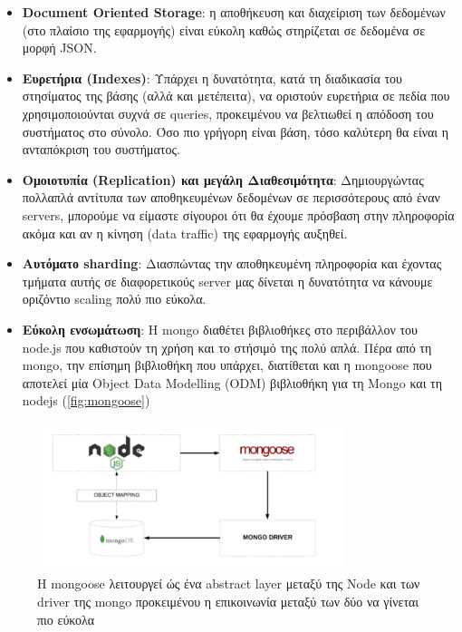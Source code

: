 \begin{itemize}
	\item \textbf{Document Oriented Storage}: η αποθήκευση και διαχείριση των δεδομένων
		(στο πλαίσιο της εφαρμογής) είναι εύκολη καθώς στηρίζεται σε δεδομένα σε μορφή JSON.
	\item \textbf{Ευρετήρια (Indexes)}: Υπάρχει η δυνατότητα, κατά τη διαδικασία του στησίματος της βάσης (αλλά και μετέπειτα),
		να οριστούν ευρετήρια σε πεδία που χρησιμοποιούνται συχνά σε queries, προκειμένου
		να βελτιωθεί η απόδοση του συστήματος στο σύνολο. Όσο πιο γρήγορη είναι βάση, τόσο
		καλύτερη θα είναι η ανταπόκριση του συστήματος. 
	\item \textbf{Ομοιοτυπία (Replication) και μεγάλη Διαθεσιμότητα}: Δημιουργώντας πολλαπλά αντίτυπα των αποθηκευμένων δεδομένων	
		σε περισσότερους από έναν servers, μπορούμε να είμαστε σίγουροι ότι θα έχουμε πρόσβαση στην
		πληροφορία ακόμα και αν η κίνηση (data traffic) της εφαρμογής αυξηθεί.
	\item \textbf{Αυτόματο sharding}: Διασπώντας την αποθηκευμένη πληροφορία και έχοντας τμήματα αυτής σε διαφορετικούς server
		μας δίνεται η δυνατότητα να κάνουμε οριζόντιο scaling πολύ πιο εύκολα. 
	\item \textbf{Εύκολη ενσωμάτωση}: Η mongo διαθέτει βιβλιοθήκες στο περιβάλλον του node.js που καθιστούν
		τη χρήση και το στήσιμό της πολύ απλά. Πέρα από τη mongo, την επίσημη βιβλιοθήκη που υπάρχει,
		διατίθεται και η mongoose που αποτελεί μία Object Data Modelling (ODM) βιβλιοθήκη για τη Mongo και τη nodejs (\autoref{fig:mongoose}) 
\end{itemize}
\begin{figure}[H]
	\centering
	\includegraphics[width=0.8\textwidth]{./images/chapter2/mongoose.png}
	\caption[Mongoose, ένα abstract layer μεταξύ Node και mongo]
	{H mongoose λειτουργεί ώς ένα abstract layer μεταξύ της Node και των driver της mongo προκειμένου η επικοινωνία μεταξύ των δύο να γίνεται πιο εύκολα}
	\label{fig:mongoose}
\end{figure}


